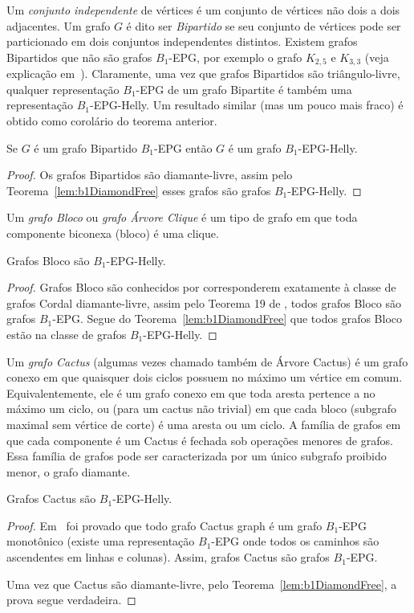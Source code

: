 Um \textit{conjunto independente} de vértices é um conjunto de vértices não dois a dois adjacentes.
Um grafo $G$ é dito ser \textit{Bipartido} se seu conjunto de vértices pode ser particionado em dois conjuntos independentes distintos.
 Existem grafos Bipartidos que não são grafos $B_1$-EPG, por exemplo o grafo $K_{2,5}$ e $K_{3,3}$ (veja explicação em~\cite{cohen2014}). Claramente, uma vez que grafos Bipartidos são triângulo-livre, qualquer representação $B_1$-EPG de um grafo Bipartite é também uma representação $B_1$-EPG-Helly.
 Um resultado similar (mas um pouco mais fraco) é obtido como corolário do teorema anterior.


\begin{corollary}
Se $G$ é um grafo Bipartido $B_1$-EPG então $G$ é um grafo $B_1$-EPG-Helly.
\end{corollary}

\begin{proof}
Os grafos Bipartidos são diamante-livre, assim pelo Teorema~\ref{lem:b1DiamondFree} esses grafos são grafos $B_1$-EPG-Helly.
\end{proof}

Um \textit{grafo Bloco } ou \textit{grafo Árvore Clique} é um tipo de grafo em que toda componente biconexa (bloco) é uma clique.

\begin{corollary}\label{lem:cdf}
 Grafos Bloco são $B_1$-EPG-Helly.
\end{corollary}

\begin{proof}
Grafos Bloco são conhecidos por corresponderem exatamente à classe de grafos Cordal diamante-livre, assim pelo Teorema 19 de \cite{ries2009}, todos grafos Bloco são grafos  $B_1$-EPG. Segue do Teorema~\ref{lem:b1DiamondFree} que todos grafos Bloco estão na classe de grafos $B_1$-EPG-Helly. 
\end{proof} 

Um \textit{grafo Cactus} (algumas vezes chamado também de Árvore Cactus) é um grafo conexo em que quaisquer dois ciclos possuem no máximo um vértice em comum. Equivalentemente, ele é um grafo conexo em que toda aresta pertence a no máximo um ciclo, ou (para um cactus não trivial) em que cada bloco (subgrafo maximal sem vértice de corte) é uma aresta ou um ciclo. A família de grafos em que cada componente é um Cactus é fechada sob operações menores de grafos. Essa família de grafos pode ser caracterizada por um único subgrafo proibido menor, o grafo diamante.
 
\begin{corollary}
Grafos Cactus são  $B_1$-EPG-Helly.
\end{corollary}
\begin{proof}
Em~\cite{cela2019monotonic} foi provado que todo grafo Cactus graph é um grafo  $B_1$-EPG monotônico 
(existe uma representação $B_1$-EPG onde todos os caminhos são ascendentes em linhas e colunas). 
Assim, grafos Cactus são grafos $B_1$-EPG. 

Uma vez que Cactus são diamante-livre, pelo Teorema~\ref{lem:b1DiamondFree}, a prova segue verdadeira.
\end{proof}


